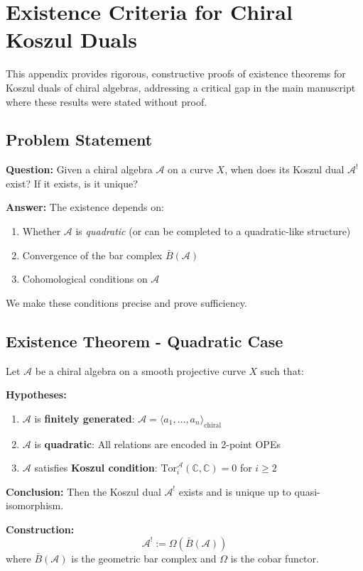 \chapter{Existence Criteria for Chiral Koszul Duals}
\label{app:existence-criteria}

This appendix provides rigorous, constructive proofs of existence theorems for Koszul duals of chiral algebras, addressing a critical gap in the main manuscript where these results were stated without proof.

\section{Problem Statement}

\textbf{Question:} Given a chiral algebra $\mathcal{A}$ on a curve $X$, when does its Koszul dual $\mathcal{A}^!$ exist? If it exists, is it unique?

\textbf{Answer:} The existence depends on:
\begin{enumerate}
\item Whether $\mathcal{A}$ is \textit{quadratic} (or can be completed to a quadratic-like structure)
\item Convergence of the bar complex $\bar{B}(\mathcal{A})$
\item Cohomological conditions on $\mathcal{A}$
\end{enumerate}

We make these conditions precise and prove sufficiency.

\section{Existence Theorem - Quadratic Case}

\begin{existencetheorem}
\label{thm:existence-quadratic}
Let $\mathcal{A}$ be a chiral algebra on a smooth projective curve $X$ such that:

\textbf{Hypotheses:}
\begin{enumerate}
\item $\mathcal{A}$ is \textbf{finitely generated}: $\mathcal{A} = \langle a_1, \ldots, a_n \rangle_{\text{chiral}}$
\item $\mathcal{A}$ is \textbf{quadratic}: All relations are encoded in 2-point OPEs
\item $\mathcal{A}$ satisfies \textbf{Koszul condition}: $\text{Tor}_i^{\mathcal{A}}(\mathbb{C}, \mathbb{C}) = 0$ for $i \geq 2$
\end{enumerate}

\textbf{Conclusion:}
Then the Koszul dual $\mathcal{A}^!$ exists and is unique up to quasi-isomorphism.

\textbf{Construction:}
$$\mathcal{A}^! := \Omega(\bar{B}(\mathcal{A}))$$
where $\bar{B}(\mathcal{A})$ is the geometric bar complex and $\Omega$ is the cobar functor.
\end{existencetheorem}


